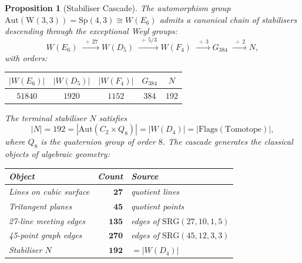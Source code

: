 \documentclass[12pt,a4paper]{article}
\newtheorem{proposition}[theorem]{Proposition}
\newcommand{\W}{\mathrm{W}(3,3)}
\begin{document}
\begin{proposition}[Stabiliser Cascade]\label{prop:stabiliser-cascade}
The automorphism group $\mathrm{Aut}(\W) = \mathrm{Sp}(4,3) \cong W(E_6)$
admits a canonical chain of stabilisers descending through the
exceptional Weyl groups:
\[
  W(E_6) \;\xrightarrow{\;\div\, 27\;}
  W(D_5) \;\xrightarrow{\;\div\, 5/3\;}
  W(F_4) \;\xrightarrow{\;\div\, 3\;}
  G_{384} \;\xrightarrow{\;\div\, 2\;}
  N,
\]
with orders:
\begin{center}
\renewcommand{\arraystretch}{1.3}
\begin{tabular}{@{}ccccc@{}}
\toprule
$|W(E_6)|$ & $|W(D_5)|$ & $|W(F_4)|$ & $G_{384}$ & $N$ \\
\midrule
$51840$ & $1920$ & $1152$ & $384$ & $192$ \\
\bottomrule
\end{tabular}
\end{center}
The terminal stabiliser $N$ satisfies
\[
  |N| = 192 = |\mathrm{Aut}(C_2 \times Q_8)|
  = |W(D_4)| = |\mathrm{Flags}(\text{Tomotope})|,
\]
where $Q_8$ is the quaternion group of order $8$.
The cascade generates the classical objects of algebraic geometry:
\begin{center}
\renewcommand{\arraystretch}{1.3}
\begin{tabular}{@{}lrl@{}}
\toprule
Object & Count & Source \\
\midrule
Lines on cubic surface & $\mathbf{27}$ & quotient lines \\
Tritangent planes & $\mathbf{45}$ & quotient points \\
27-line meeting edges & $\mathbf{135}$ & edges of $\mathrm{SRG}(27,10,1,5)$ \\
45-point graph edges & $\mathbf{270}$ & edges of $\mathrm{SRG}(45,12,3,3)$ \\
Stabiliser $N$ & $\mathbf{192}$ & $= |W(D_4)|$ \\
\bottomrule
\end{tabular}
\end{center}
\end{proposition}
\end{document}
